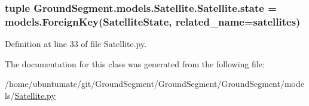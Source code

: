 \subsubsection[{state}]{\setlength{\rightskip}{0pt plus 5cm}tuple Ground\+Segment.\+models.\+Satellite.\+Satellite.\+state = models.\+Foreign\+Key({\bf Satellite\+State}, related\+\_\+name=\textquotesingle{}satellites\textquotesingle{})\hspace{0.3cm}{\ttfamily [static]}}\label{class_ground_segment_1_1models_1_1_satellite_1_1_satellite_a4cdd4dae77da6f58058ca51ac71bd31d}


Definition at line 33 of file Satellite.\+py.



The documentation for this class was generated from the following file\+:\begin{DoxyCompactItemize}
\item 
/home/ubuntumate/git/\+Ground\+Segment/\+Ground\+Segment/\+Ground\+Segment/models/\hyperlink{_satellite_8py}{Satellite.\+py}\end{DoxyCompactItemize}
